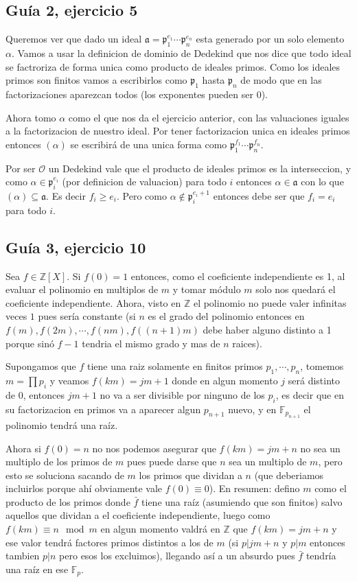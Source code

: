 \documentclass[12pt]{amsart}
\newcommand{\ZZ}{\mathbb{Z}}
\newcommand{\FF}{\mathbb{F}}
\newcommand{\pp}{\mathfrak{p}}
\newcommand{\aaa}{\mathfrak{a}}
\newcommand{\OO}{\mathcal{O}}
\theoremstyle{plain}
\begin{document}
\subsection*{Guía 2, ejercicio 5}

Queremos ver que dado un ideal $\aaa = \pp_1^{e_1}\cdots\pp_n^{e_n}$ 
esta generado por un solo elemento $\alpha$. Vamos a usar la 
definicion de dominio de Dedekind que nos dice que todo ideal se 
factroriza de forma unica como producto de ideales primos.
Como los ideales primos son finitos vamos a escribirlos como $\pp_1$
hasta $\pp_n$ de modo que en las factorizaciones aparezcan todos (los
exponentes pueden ser $0$).

Ahora tomo $\alpha$ como el que nos da el ejercicio anterior, con las 
valuaciones iguales a la factorizacion de nuestro ideal. Por tener 
factorizacion unica en ideales primos entonces $(\alpha)$ se escribirá
de una unica forma como $\pp_1^{f_1}\cdots\pp_n^{f_n}$.

Por ser $\OO$ un Dedekind vale que el producto de ideales primos es la 
interseccion, y como $\alpha \in \pp_i^{e_i}$ (por definicion de valuacion)
para todo $i$ entonces $\alpha \in \aaa$ con lo que $(\alpha)\subseteq\aaa$.
Es decir $f_i\geq e_i$. Pero como $\alpha \notin \pp_i^{e_i+1}$ entonces 
debe ser que $f_i=e_i$ para todo $i$.


\subsection*{Guía 3, ejercicio 10}

Sea $f\in \ZZ[X]$. Si $f(0)=1$ entonces, como el coeficiente 
independiente es 1, al evaluar el polinomio en multiplos de $m$ y 
tomar módulo $m$ solo nos quedará el coeficiente independiente. Ahora,
visto en $\ZZ$ el polinomio no puede valer infinitas veces $1$ pues 
sería constante (si $n$ es el grado del polinomio entonces en $f(m), 
f(2m), \cdots, f(nm), f((n+1)m)$ debe haber alguno distinto a 1 
porque sinó $f-1$ tendria el mismo grado y mas de $n$ raices). 

Supongamos que $f$ tiene una raiz solamente en finitos primos $p_1,
\cdots, p_n$, tomemos $m=\prod p_i$ y veamos $f(km) = jm+1$ donde en
algun momento $j$ será distinto de 0, entonces $jm+1$ no va a ser 
divisible por ninguno de los $p_i$, es decir que en su factorizacion 
en primos va a aparecer algun $p_{n+1}$ nuevo, y en $\FF_{p_{n+1}}$
el polinomio tendrá una raíz.

Ahora si $f(0) = n$ no nos podemos asegurar que $f(km) = jm+n$ no 
sea un multiplo de los primos de $m$ pues puede darse que $n$ sea un
multiplo de $m$, pero esto se soluciona sacando de $m$ los primos que 
dividan a $n$ (que deberiamos incluirlos porque ahí obviamente vale 
$f(0)\equiv 0$). En resumen: defino $m$ como el producto de los primos
donde $\bar{f}$ tiene una raíz (asumiendo que son finitos) salvo 
aquellos que dividan a el coeficiente independiente, luego como 
$f(km) \equiv n \mod m$ en algun momento valdrá en $\ZZ$ que 
$f(km) = jm+n$ y ese valor tendrá factores primos distintos a los de 
$m$ (si $p|jm+n$ y $p|m$ entonces tambien $p|n$ pero esos los 
excluimos), llegando así a un absurdo pues $\bar{f}$ tendría una raíz 
en ese $\FF_p$.
\end{document}
